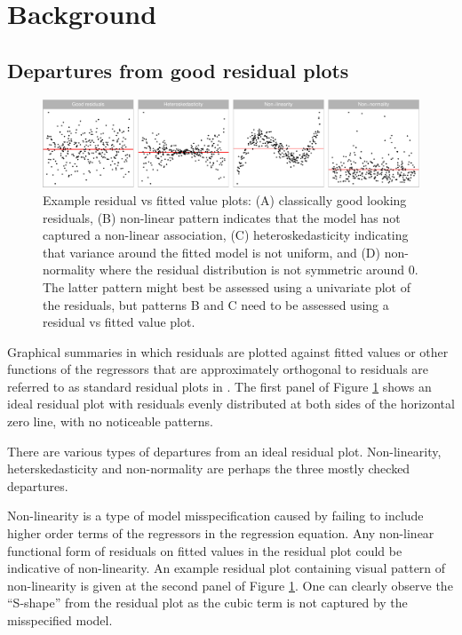 \documentclass[]{interact}
\theoremstyle{plain}%
\theoremstyle{definition}
\theoremstyle{remark}
\begin{document}
\hypertarget{background}{%
\section{Background}\label{background}}

\hypertarget{departures-from-good-residual-plots}{%
\subsection{Departures from good residual
plots}\label{departures-from-good-residual-plots}}

\begin{figure}

{\centering \includegraphics[width=1\linewidth]{paper_comparison_files/figure-latex/residual-plot-common-departures-1} 

}

\caption{Example residual vs fitted value plots: (A) classically good looking residuals, (B) non-linear pattern indicates that the model has not captured a non-linear association, (C) heteroskedasticity indicating that variance around the fitted model is not uniform, and (D) non-normality where the residual distribution is not symmetric around 0. The latter pattern might best be assessed using a univariate plot of the residuals, but patterns B and C need to be assessed using a residual vs fitted value plot.}\label{fig:residual-plot-common-departures}
\end{figure}

Graphical summaries in which residuals are plotted against fitted values
or other functions of the regressors that are approximately orthogonal
to residuals are referred to as standard residual plots in
\citet{cook1982residuals}. The first panel of Figure
\ref{fig:residual-plot-common-departures} shows an ideal residual plot
with residuals evenly distributed at both sides of the horizontal zero
line, with no noticeable patterns.

There are various types of departures from an ideal residual plot.
Non-linearity, heterskedasticity and non-normality are perhaps the three
mostly checked departures.

Non-linearity is a type of model misspecification caused by failing to
include higher order terms of the regressors in the regression equation.
Any non-linear functional form of residuals on fitted values in the
residual plot could be indicative of non-linearity. An example residual
plot containing visual pattern of non-linearity is given at the second
panel of Figure \ref{fig:residual-plot-common-departures}. One can
clearly observe the ``S-shape'' from the residual plot as the cubic term
is not captured by the misspecified model.
\end{document}
